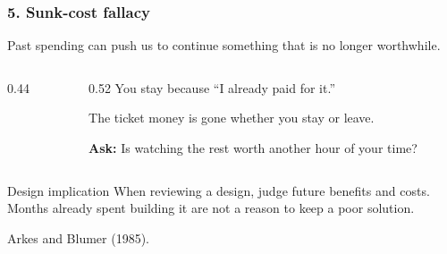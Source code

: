 \documentclass{beamer}
\begin{document}
\begin{frame}
    \frametitle{5. Sunk-cost fallacy}
    \small
    Past spending can push us to continue something that is no longer worthwhile.
    \medskip
    \begin{columns}[c]
    \begin{column}{0.44\textwidth}
    \centering
    \end{column}
    \begin{column}{0.52\textwidth}
You stay because ``I already paid for it.''
\medskip

The ticket money is gone whether you stay or leave.
\medskip

\textbf{Ask:} Is watching the rest worth another hour of your time?
    \end{column}
    \end{columns}
    \begin{block}{Design implication}
When reviewing a design, judge future benefits and costs. Months already spent building it are not a reason to keep a poor solution.
    \end{block}
    {\tiny Arkes and Blumer (1985).}
\end{frame}
\end{document}
